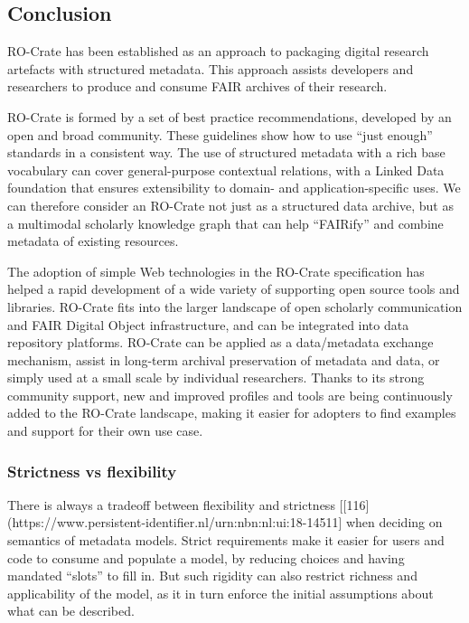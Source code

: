 {\hypertarget{conclusion}{%
\subsection{Conclusion}\label{conclusion}}

RO-Crate has been established as an approach to packaging digital
research artefacts with structured metadata. This approach assists
developers and researchers to produce and consume FAIR archives of their
research.

RO-Crate is formed by a set of best practice recommendations, developed
by an open and broad community. These guidelines show how to use ``just
enough'' standards in a consistent way. The use of structured metadata
with a rich base vocabulary can cover general-purpose contextual
relations, with a Linked Data foundation that ensures extensibility to
domain- and application-specific uses. We can therefore consider an
RO-Crate not just as a structured data archive, but as a multimodal
scholarly knowledge graph that can help ``FAIRify'' and combine metadata
of existing resources.

The adoption of simple Web technologies in the RO-Crate specification
has helped a rapid development of a wide variety of supporting open
source tools and libraries. RO-Crate fits into the larger landscape of
open scholarly communication and FAIR Digital Object infrastructure, and
can be integrated into data repository platforms. RO-Crate can be
applied as a data/metadata exchange mechanism, assist in long-term
archival preservation of metadata and data, or simply used at a small
scale by individual researchers. Thanks to its strong community support,
new and improved profiles and tools are being continuously added to the
RO-Crate landscape, making it easier for adopters to find examples and
support for their own use case.

\hypertarget{strictness-vs-flexibility}{%
\subsubsection{Strictness vs
flexibility}\label{strictness-vs-flexibility}}

There is always a tradeoff between flexibility and strictness
{[}{[}116{]}(https://www.persistent-identifier.nl/urn:nbn:nl:ui:18-14511{]}
when deciding on semantics of metadata models. Strict requirements make
it easier for users and code to consume and populate a model, by
reducing choices and having mandated ``slots'' to fill in. But such
rigidity can also restrict richness and applicability of the model, as
it in turn enforce the initial assumptions about what can be described.

}
